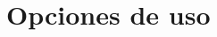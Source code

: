 \documentclass[informe.tex]{subfiles}
\begin{document}
  
  \section{Opciones de uso}
  
    
\end{document}
